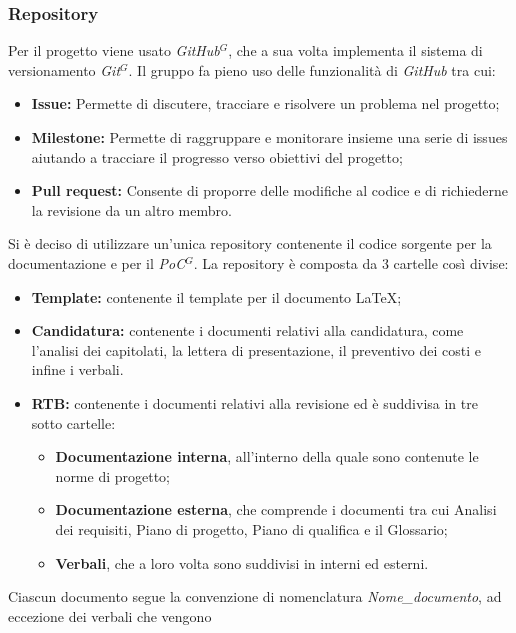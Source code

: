\subsubsection{Repository}
    Per il progetto viene usato \emph{GitHub}$^{G}$, che a sua volta implementa il sistema di versionamento 
    \emph{Git}$^{G}$. Il gruppo fa pieno uso delle funzionalità di \emph{GitHub} tra cui:
    \begin{itemize}
        \item \textbf{Issue:} Permette di discutere, tracciare e risolvere un problema nel progetto;
        \item \textbf{Milestone:} Permette di raggruppare e monitorare insieme una serie di issues aiutando a tracciare il progresso verso obiettivi del progetto;
        \item \textbf{Pull request:} Consente di proporre delle modifiche al codice e di richiederne la revisione da un altro membro.
    \end{itemize}
    Si è deciso di utilizzare un'unica repository contenente il codice sorgente per la documentazione e per il \emph{PoC}$^{G}$.
    La repository è composta da 3 cartelle così divise:
    \begin{itemize}
        \item \textbf{Template:} contenente il template per il documento \LaTeX;
        \item \textbf{Candidatura:} contenente i documenti relativi alla candidatura, come l'analisi dei capitolati,
        la lettera di presentazione, il preventivo dei costi e infine i verbali.
        \item \textbf{RTB:} contenente i documenti relativi alla revisione ed è suddivisa in tre sotto cartelle:
        \begin{itemize}
            \item \textbf{Documentazione interna}, all'interno della quale sono contenute le norme di progetto;
            \item \textbf{Documentazione esterna}, che comprende i documenti tra cui Analisi dei requisiti, Piano di progetto, Piano di qualifica e il Glossario;
            \item \textbf{Verbali}, che a loro volta sono suddivisi in interni ed esterni.
        \end{itemize}
    \end{itemize}
    Ciascun documento segue la convenzione di nomenclatura \emph{Nome\_documento}, ad eccezione dei verbali che vengono 
